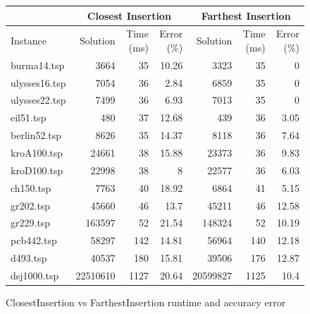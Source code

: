 \begin{figure}[H]
    \centering

    \begin{tabular}{lrrrrrr}
    \toprule
    \multicolumn{1}{c}{ } & \multicolumn{3}{c}{Closest Insertion} & \multicolumn{3}{c}{Farthest Insertion} \\
    \hline
    Instance & Solution &   Time (ms) &   Error (\%) & Solution &   Time (ms) &   Error (\%) \\
    \hline
    burma14.tsp   &     3664 &          35 &       10.26 &       3323 &          35 &        0    \\
    ulysses16.tsp &     7054 &          36 &        2.84 &       6859 &          35 &        0    \\
    ulysses22.tsp &     7499 &          36 &        6.93 &       7013 &          35 &        0    \\
    eil51.tsp     &      480 &          37 &       12.68 &        439 &          36 &        3.05 \\
    berlin52.tsp  &     8626 &          35 &       14.37 &       8118 &          36 &        7.64 \\
    kroA100.tsp   &    24661 &          38 &       15.88 &      23373 &          36 &        9.83 \\
    kroD100.tsp   &    22998 &          38 &        8    &      22577 &          36 &        6.03 \\
    ch150.tsp     &     7763 &          40 &       18.92 &       6864 &          41 &        5.15 \\
    gr202.tsp     &    45660 &          46 &       13.7  &      45211 &          46 &       12.58 \\
    gr229.tsp     &   163597 &          52 &       21.54 &     148324 &          52 &       10.19 \\
    pcb442.tsp    &    58297 &         142 &       14.81 &      56964 &         140 &       12.18 \\
    d493.tsp      &    40537 &         180 &       15.81 &      39506 &         176 &       12.87 \\
    dsj1000.tsp   & 22510610 &        1127 &       20.64 &   20599827 &        1125 &       10.4  \\
    \bottomrule
    \end{tabular}

    \caption{ClosestInsertion vs FarthestInsertion runtime and accuracy error}
    \label{table:closest-farthest-insertion-runtime-accuracy}
\end{figure}

